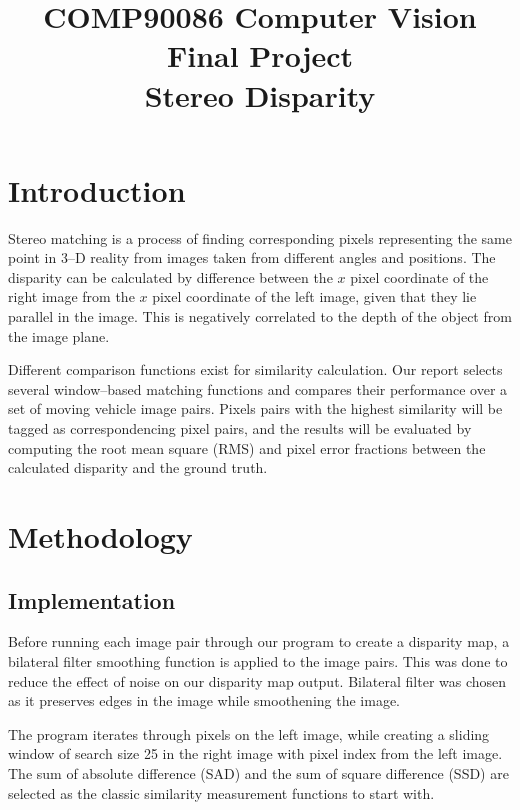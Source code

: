 \documentclass[conference]{IEEEtran}
\begin{document}
\title{COMP90086 Computer Vision Final Project\\
Stereo Disparity
}
\author{
\and
{}
}
\maketitle

\thispagestyle{plain}
\pagestyle{plain}

\section{Introduction}
Stereo matching is a process of finding corresponding pixels representing the same point in 3--D reality from images taken from different angles and positions. The disparity can be calculated by difference between the $x$ pixel coordinate of the right image from the $x$ pixel coordinate of the left image, given that they lie parallel in the image. This is negatively correlated to the depth of the object from the image plane.

Different comparison functions exist for similarity calculation. Our report selects several window--based matching functions and compares their performance over a set of moving vehicle image pairs. Pixels pairs with the highest similarity will be tagged as correspondencing pixel pairs, and the results will be evaluated by computing the root mean square (RMS) and pixel error fractions between the calculated disparity and the ground truth.

\section{Methodology}
\subsection{Implementation}
Before running each image pair through our program to create a disparity map, a bilateral filter smoothing function is applied to the image pairs. This was done to reduce the effect of noise on our disparity map output. Bilateral filter was chosen as it preserves edges in the image while smoothening the image.

The program iterates through pixels on the left image, while creating a sliding window of search size 25 in the right image with pixel index from the left image. The sum of absolute difference (SAD) and the sum of square difference (SSD) are selected as the classic similarity measurement functions to start with.
\end{document}
